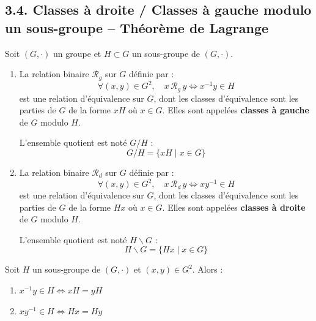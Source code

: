 \documentclass[a4paper,11pt]{article}
\newcommand{\mot}[1]{\textcolor{bordeaux}{\textbf{#1}}}
\begin{document}
\newpage
\subsection{3.4. Classes à droite / Classes à gauche modulo un sous-groupe -- Théorème de Lagrange}

\begin{definition}
Soit $(G, \cdot)$ un groupe et $H \subset G$ un sous-groupe de $(G, \cdot)$.
\begin{enumerate}
    \item La relation binaire $\mathcal{R}_g$ sur $G$ définie par :
    \[
    \forall (x, y) \in G^2, \quad x \, \mathcal{R}_g \, y \iff x^{-1} y \in H
    \]
    est une relation d'équivalence sur $G$, dont les classes d'équivalence sont les parties de $G$ de la forme $xH$ où $x \in G$. Elles sont appelées \mot{classes à gauche} de $G$ modulo $H$.
    
    L'ensemble quotient est noté $G / H$ :
    \[
    G / H = \{ xH \mid x \in G \}
    \]
    
    \item La relation binaire $\mathcal{R}_d$ sur $G$ définie par :
    \[
    \forall (x, y) \in G^2, \quad x \, \mathcal{R}_d \, y \iff x y^{-1} \in H
    \]
    est une relation d'équivalence sur $G$, dont les classes d'équivalence sont les parties de $G$ de la forme $Hx$ où $x \in G$. Elles sont appelées \mot{classes à droite} de $G$ modulo $H$.
    
    L'ensemble quotient est noté $H \backslash G$ :
    \[
    H \backslash G = \{ Hx \mid x \in G \}
    \]
\end{enumerate}
\end{definition}

\begin{lemme}
Soit $H$ un sous-groupe de $(G, \cdot)$ et $(x, y) \in G^2$. Alors :
\begin{enumerate}
    \item $x^{-1} y \in H \iff xH = yH$
    \item $x y^{-1} \in H \iff Hx = Hy$
\end{enumerate}
\end{lemme}
\end{document}

